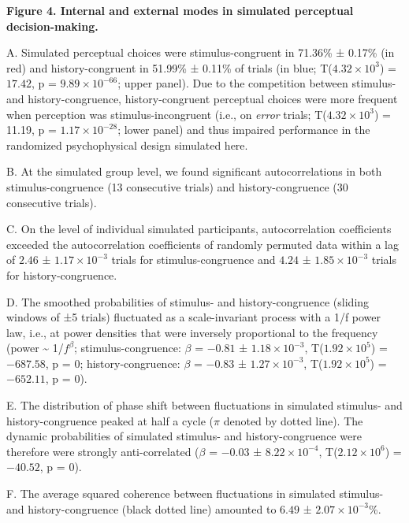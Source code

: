 \documentclass[
]{article}
\begin{document}
\textbf{Figure 4. Internal and external modes in simulated perceptual
decision-making.}

A. Simulated perceptual choices were stimulus-congruent in 71.36\% ±
0.17\% (in red) and history-congruent in 51.99\% ± 0.11\% of trials (in
blue; T(\(\ensuremath{4.32\times 10^{3}}\)) = \(17.42\), p =
\(\ensuremath{9.89\times 10^{-66}}\); upper panel). Due to the
competition between stimulus- and history-congruence, history-congruent
perceptual choices were more frequent when perception was
stimulus-incongruent (i.e., on \emph{error} trials;
T(\ensuremath{4.32\times 10^{3}}) = 11.19, p =
\(\ensuremath{1.17\times 10^{-28}}\); lower panel) and thus impaired
performance in the randomized psychophysical design simulated here.

B. At the simulated group level, we found significant autocorrelations
in both stimulus-congruence (13 consecutive trials) and
history-congruence (30 consecutive trials).

C. On the level of individual simulated participants, autocorrelation
coefficients exceeded the autocorrelation coefficients of randomly
permuted data within a lag of \(2.46\) ±
\(\ensuremath{1.17\times 10^{-3}}\) trials for stimulus-congruence and
\(4.24\) ± \(\ensuremath{1.85\times 10^{-3}}\) trials for
history-congruence.

D. The smoothed probabilities of stimulus- and history-congruence
(sliding windows of ±5 trials) fluctuated as a scale-invariant process
with a 1/f power law, i.e., at power densities that were inversely
proportional to the frequency (power \textasciitilde{} 1/\(f^\beta\);
stimulus-congruence: \(\beta\) = \(-0.81\) ±
\(\ensuremath{1.18\times 10^{-3}}\),
T(\(\ensuremath{1.92\times 10^{5}}\)) = \(-687.58\), p = \(0\);
history-congruence: \(\beta\) = \(-0.83\) ±
\(\ensuremath{1.27\times 10^{-3}}\),
T(\(\ensuremath{1.92\times 10^{5}}\)) = \(-652.11\), p = \(0\)).

E. The distribution of phase shift between fluctuations in simulated
stimulus- and history-congruence peaked at half a cycle (\(\pi\) denoted
by dotted line). The dynamic probabilities of simulated stimulus- and
history-congruence were therefore were strongly anti-correlated
(\(\beta\) = \(-0.03\) ± \(\ensuremath{8.22\times 10^{-4}}\),
T(\(\ensuremath{2.12\times 10^{6}}\)) = \(-40.52\), p = \(0\)).

F. The average squared coherence between fluctuations in simulated
stimulus- and history-congruence (black dotted line) amounted to
\(6.49\) ± \(\ensuremath{2.07\times 10^{-3}}\)\%.
\end{document}

